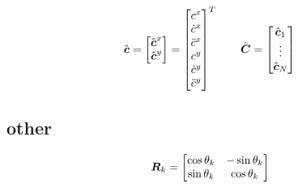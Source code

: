 \documentclass[12pt,a4paper]{article}
\begin{document}
\begin{equation*}
\hat{\mbox{\boldmath $c$}} = \begin{bmatrix} \hat{\mbox{\boldmath $c$}}^x \\ \hat{\mbox{\boldmath $c$}}^y \end{bmatrix} =
          \begin{bmatrix} c^x \\ \dot{c}^x \\ \ddot{c}^x \\ c^y \\ \dot{c}^y \\ \ddot{c}^y \end{bmatrix}^T
\quad\quad
\hat{\mbox{\boldmath $C$}} = \begin{bmatrix} \hat{\mbox{\boldmath $c$}}_1 \\ \vdots \\ \hat{\mbox{\boldmath $c$}}_N \end{bmatrix}\\
\end{equation*}



\subsection{other}
\begin{equation*}
\mbox{\boldmath $R$}_k = 
\begin{bmatrix}
    \cos{\theta_k}  &   -\sin{\theta_k} \\
    \sin{\theta_k}  &   \cos{\theta_k} \\
\end{bmatrix}
\end{equation*}











\end{document}
